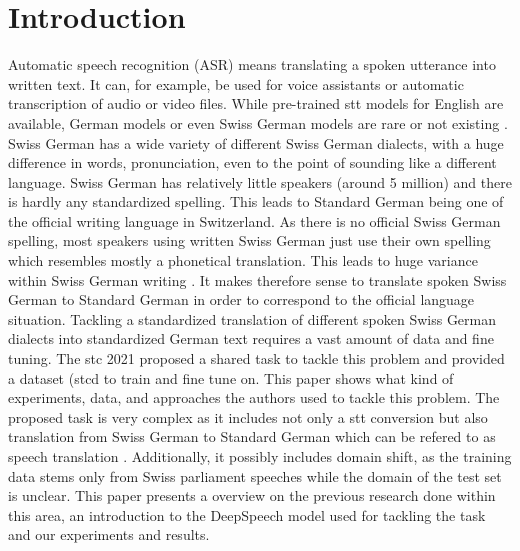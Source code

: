 \section{Introduction}
Automatic speech recognition (ASR) means translating a spoken utterance into written text. It can, for example, be used for voice assistants or automatic transcription of audio or video files. While pre-trained \gls{stt} models for English are available, German models or even Swiss German models are rare or not existing \cite{Agarwal2019GermanES}. Swiss German has a wide variety of different Swiss German dialects, with a huge difference in words, pronunciation, even to the point of sounding like a different language. Swiss German has relatively little speakers (around 5 million) and there is hardly any standardized spelling. This leads to Standard German being one of the official writing language in Switzerland. As there is no official Swiss German spelling, most speakers using written Swiss German just use their own spelling which resembles mostly a phonetical translation. This leads to huge variance within Swiss German writing \citep{pluss2020}. It makes therefore sense to translate spoken Swiss German to Standard German in order to correspond to the official language situation. Tackling a standardized translation of different spoken Swiss German dialects into standardized German text requires a vast amount of data and fine tuning. The \gls{stc} 2021 proposed a shared task to tackle this problem and provided a dataset
(\gls{stcd} to train and fine tune on. This paper shows what kind of experiments, data, and approaches the authors used to tackle this problem. The proposed task is very complex as it includes not only a \gls{stt} conversion but also translation from Swiss German to Standard German which can be refered to as speech translation \cite{pluss2020}. Additionally, it possibly includes domain shift, as the training data stems only from Swiss parliament speeches while the domain of the test set is unclear. 
This paper presents a overview on the previous research done within this area, an introduction to the DeepSpeech model used for tackling the task and our experiments and results.  
